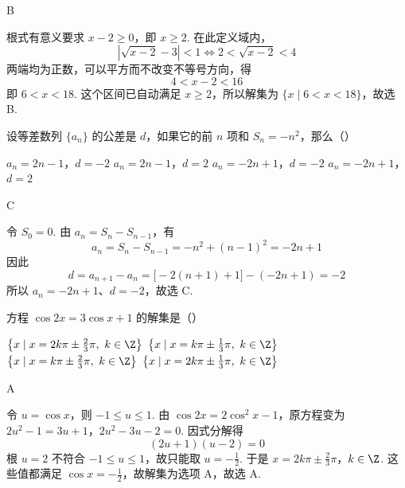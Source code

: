 \begin{answer}
B
\end{answer}

\begin{solution}
根式有意义要求 \(x-2\geqslant0\)，即 \(x\geqslant2\). 在此定义域内，
\[
\left|\sqrt{x-2}-3\right|<1
\Longleftrightarrow 2<\sqrt{x-2}<4
\]
两端均为正数，可以平方而不改变不等号方向，得
\[
4<x-2<16
\]
即 \(6<x<18\). 这个区间已自动满足 \(x\geqslant2\)，所以解集为 \(\{x\mid6<x<18\}\)，故选 B.
\end{solution}

\begin{problem}
设等差数列 \(\{a_n\}\) 的公差是 \(d\)，如果它的前 \(n\) 项和 \(S_n=-n^2\)，那么（\quad）

\choices
    {\(a_n=2n-1\)，\(d=-2\)}
    {\(a_n=2n-1\)，\(d=2\)}
    {\(a_n=-2n+1\)，\(d=-2\)}
    {\(a_n=-2n+1\)，\(d=2\)}
\end{problem}

\begin{answer}
C
\end{answer}

\begin{solution}
令 \(S_0=0\). 由 \(a_n=S_n-S_{n-1}\)，有
\[
a_n=S_n-S_{n-1}=-n^2+(n-1)^2=-2n+1
\]
因此
\[
d=a_{n+1}-a_n=\bigl[-2(n+1)+1\bigr]-(-2n+1)=-2
\]
所以 \(a_n=-2n+1\)、\(d=-2\)，故选 C.
\end{solution}

\begin{problem}
方程 \(\cos 2x=3\cos x+1\) 的解集是（\quad）

\choices
    {\(\left\{x\mid x=2k\pi\pm\frac{2}{3}\pi,\ k\in\Z\right\}\)}
    {\(\left\{x\mid x=k\pi\pm\frac{1}{3}\pi,\ k\in\Z\right\}\)}
    {\(\left\{x\mid x=k\pi\pm\frac{2}{3}\pi,\ k\in\Z\right\}\)}
    {\(\left\{x\mid x=2k\pi\pm\frac{1}{3}\pi,\ k\in\Z\right\}\)}
\end{problem}

\begin{answer}
A
\end{answer}

\begin{solution}
令 \(u=\cos x\)，则 \(-1\leqslant u\leqslant1\). 由 \(\cos 2x=2\cos^2x-1\)，原方程变为
\(2u^2-1=3u+1\)，\(2u^2-3u-2=0\).
因式分解得
\[
(2u+1)(u-2)=0
\]
根 \(u=2\) 不符合 \(-1\leqslant u\leqslant1\)，故只能取 \(u=-\frac12\). 于是
\(x=2k\pi\pm\frac{2}{3}\pi\)，\(k\in\Z\).
这些值都满足 \(\cos x=-\frac12\)，故解集为选项 A，故选 A.
\end{solution}

